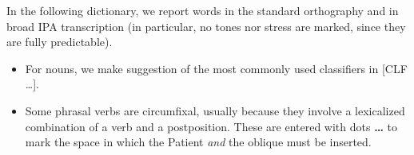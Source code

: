 \documentclass[11pt]{book}
\newcommand{\qcn}[1]{\textbf{#1}}
\begin{document}
In the following dictionary, we report words in the standard orthography and in broad IPA transcription (in particular, no tones nor stress are marked, since they are fully predictable).

\begin{itemize}
	\item For nouns, we make suggestion of the most commonly used classifiers in [CLF \ldots].
	\item Some phrasal verbs are circumfixal, usually because they involve a lexicalized combination of a verb and a postposition. These are entered with dots \qcn{\ldots} to mark the space in which the Patient \emph{and} the oblique must be inserted.
\end{itemize}





\newcommand{\dictentry}[3]{\qcn{#1} - /#2/ \hangindent=0.4cm #3 \par }
\newcommand{\dictsense}[3]{$\bullet$~\emph{#1} #2 #3 }
\newcommand{\dictexample}[2]{\qcn{#1} \emph{#2}}
\newcommand{\dictclassifiers}[1]{\begin{scriptsize}[CLF #1] \end{scriptsize}}
\newcommand{\dictref}[1]{\qcn{#1}}
\newcommand{\dictsensesep}{\,\,}

\begin{multicols}{2}
\begin{singlespace}



\end{singlespace}
\end{multicols}
\end{document}
